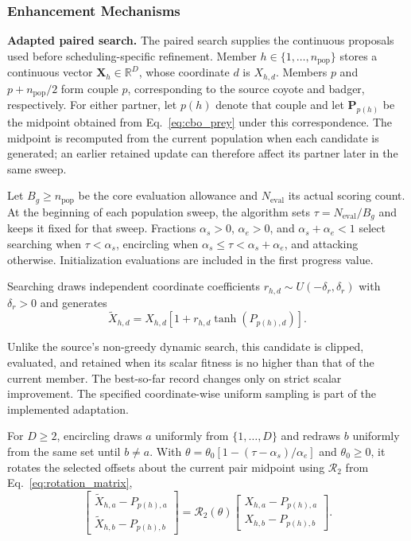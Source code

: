 \documentclass[pdflatex,onecolumn,sn-mathphys-num]{sn-jnl}
\begin{document}
\FloatBarrier
\subsubsection{Enhancement Mechanisms}\label{sec:enhancements}

\textbf{Adapted paired search.}
The paired search supplies the continuous proposals used before scheduling-specific refinement. Member $h\in\{1,\ldots,n_{\mathrm{pop}}\}$ stores a continuous vector $\mathbf{X}_h\in\mathbb{R}^{D}$, whose coordinate $d$ is $X_{h,d}$. Members $p$ and $p+n_{\mathrm{pop}}/2$ form couple $p$, corresponding to the source coyote and badger, respectively. For either partner, let $p(h)$ denote that couple and let $\mathbf{P}_{p(h)}$ be the midpoint obtained from Eq.~\eqref{eq:cbo_prey} under this correspondence. The midpoint is recomputed from the current population when each candidate is generated; an earlier retained update can therefore affect its partner later in the same sweep.

Let $B_g\geq n_{\mathrm{pop}}$ be the core evaluation allowance and $N_{\mathrm{eval}}$ its actual scoring count. At the beginning of each population sweep, the algorithm sets $\tau=N_{\mathrm{eval}}/B_g$ and keeps it fixed for that sweep. Fractions $\alpha_s>0$, $\alpha_e>0$, and $\alpha_s+\alpha_e<1$ select searching when $\tau<\alpha_s$, encircling when $\alpha_s\leq\tau<\alpha_s+\alpha_e$, and attacking otherwise. Initialization evaluations are included in the first progress value.

Searching draws independent coordinate coefficients $r_{h,d}\sim U(-\delta_r,\delta_r)$ with $\delta_r>0$ and generates
\begin{equation}\label{eq:lscbo_search}
\widetilde{X}_{h,d}=X_{h,d}\left[1+r_{h,d}\tanh(P_{p(h),d})\right].
\end{equation}

Unlike the source's non-greedy dynamic search, this candidate is clipped, evaluated, and retained when its scalar fitness is no higher than that of the current member. The best-so-far record changes only on strict scalar improvement. The specified coordinate-wise uniform sampling is part of the implemented adaptation.

For $D\geq2$, encircling draws $a$ uniformly from $\{1,\ldots,D\}$ and redraws $b$ uniformly from the same set until $b\neq a$. With $\theta=\theta_0[1-(\tau-\alpha_s)/\alpha_e]$ and $\theta_0\geq0$, it rotates the selected offsets about the current pair midpoint using $\mathcal{R}_2$ from Eq.~\eqref{eq:rotation_matrix},
\begin{equation}\label{eq:lscbo_rotation}
\begin{bmatrix}
\widetilde{X}_{h,a}-P_{p(h),a}\\
\widetilde{X}_{h,b}-P_{p(h),b}
\end{bmatrix}
=
\mathcal{R}_2(\theta)
\begin{bmatrix}
X_{h,a}-P_{p(h),a}\\
X_{h,b}-P_{p(h),b}
\end{bmatrix}.
\end{equation}
\end{document}
